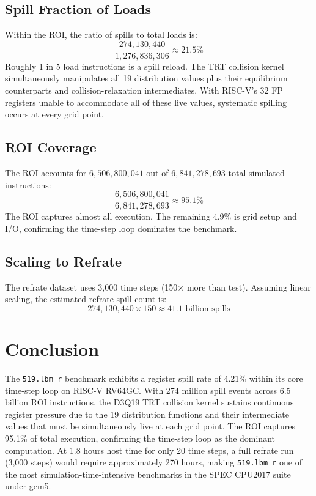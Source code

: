 \documentclass[conference]{IEEEtran}
\begin{document}
\subsection{Spill Fraction of Loads}

Within the ROI, the ratio of spills to total loads is:
\[
\frac{274{,}130{,}440}{1{,}276{,}836{,}306} \approx 21.5\%
\]
Roughly 1 in 5 load instructions is a spill reload. The TRT collision
kernel simultaneously manipulates all 19 distribution values plus
their equilibrium counterparts and collision-relaxation intermediates.
With RISC-V's 32 FP registers unable to accommodate all of these
live values, systematic spilling occurs at every grid point.

\subsection{ROI Coverage}

The ROI accounts for $6{,}506{,}800{,}041$ out of $6{,}841{,}278{,}693$
total simulated instructions:
\[
\frac{6{,}506{,}800{,}041}{6{,}841{,}278{,}693} \approx 95.1\%
\]
The ROI captures almost all execution. The remaining 4.9\% is grid
setup and I/O, confirming the time-step loop dominates the benchmark.

\subsection{Scaling to Refrate}

The refrate dataset uses 3,000 time steps (150$\times$ more than test).
Assuming linear scaling, the estimated refrate spill count is:
\[
274{,}130{,}440 \times 150 \approx 41.1 \text{ billion spills}
\]

\section{Conclusion}

The \texttt{519.lbm\_r} benchmark exhibits a register spill rate of
4.21\% within its core time-step loop on RISC-V RV64GC. With 274
million spill events across 6.5 billion ROI instructions, the D3Q19
TRT collision kernel sustains continuous register pressure due to the
19 distribution functions and their intermediate values that must be
simultaneously live at each grid point. The ROI captures 95.1\% of
total execution, confirming the time-step loop as the dominant
computation. At 1.8 hours host time for only 20 time steps, a full
refrate run (3,000 steps) would require approximately 270 hours,
making \texttt{519.lbm\_r} one of the most simulation-time-intensive
benchmarks in the SPEC CPU2017 suite under gem5.
\end{document}
